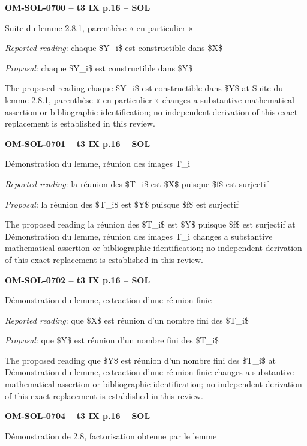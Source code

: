 \par\noindent\textbf{OM-SOL-0700 -- t3 IX p.16 -- SOL}\par
Suite du lemme 2.8.1, parenthèse « en particulier »\par
\emph{Reported reading}: chaque \$Y\_i\$ est constructible dans \$X\$\par
\emph{Proposal}: chaque \$Y\_i\$ est constructible dans \$Y\$\par
The proposed reading chaque \$Y\_i\$ est constructible dans \$Y\$ at Suite du lemme 2.8.1, parenthèse « en particulier » changes a substantive mathematical assertion or bibliographic identification; no independent derivation of this exact replacement is established in this review.\par
\par\noindent\textbf{OM-SOL-0701 -- t3 IX p.16 -- SOL}\par
Démonstration du lemme, réunion des images T\_i\par
\emph{Reported reading}: la réunion des \$T\_i\$ est \$X\$ puisque \$f\$ est surjectif\par
\emph{Proposal}: la réunion des \$T\_i\$ est \$Y\$ puisque \$f\$ est surjectif\par
The proposed reading la réunion des \$T\_i\$ est \$Y\$ puisque \$f\$ est surjectif at Démonstration du lemme, réunion des images T\_i changes a substantive mathematical assertion or bibliographic identification; no independent derivation of this exact replacement is established in this review.\par
\par\noindent\textbf{OM-SOL-0702 -- t3 IX p.16 -- SOL}\par
Démonstration du lemme, extraction d'une réunion finie\par
\emph{Reported reading}: que \$X\$ est réunion d'un nombre fini des \$T\_i\$\par
\emph{Proposal}: que \$Y\$ est réunion d'un nombre fini des \$T\_i\$\par
The proposed reading que \$Y\$ est réunion d'un nombre fini des \$T\_i\$ at Démonstration du lemme, extraction d'une réunion finie changes a substantive mathematical assertion or bibliographic identification; no independent derivation of this exact replacement is established in this review.\par
\par\noindent\textbf{OM-SOL-0704 -- t3 IX p.16 -- SOL}\par
Démonstration de 2.8, factorisation obtenue par le lemme\par
